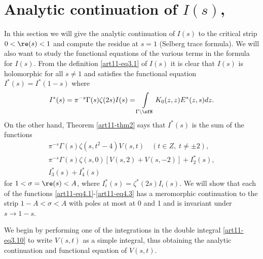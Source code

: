 \section{Analytic continuation of $I(s)$,}\label{art11-sec4}
In this section we will give the analytic continuation of $I(s)$ to the critical strip $0< \re (s) <1$ and compute the residue at $s=1$ (Selberg trace formula). We will also want to study the functional equations of the various terms in the formula for $I(s)$. From the definition \eqref{art11-eq3.1} of $I(s)$ it is clear that $I(s)$ is holomorphic for all $s \neq 1$ and satisfies the functional equation $I^\ast (s) = I^\ast (1-s)$ where
$$
I^\ast (s) = \pi^{-s} \Gamma (s) \zeta (2s) I (s) =\int\limits_{\Gamma \backslash \sfH} K_0 (z, z) E^\ast (z,s) dz.
$$
On the other hand, Theorem \ref{art11-thm2} says that $I^\ast (s)$ is the sum of the functions 
\begin{gather*}
\pi^{-s} \Gamma(s) \zeta (s, t^2 - 4) V (s,t ) \quad (t \in Z , \; t \neq \pm 2) , \tag{4.1}\label{art11-eq4.1}\\
\pi^{-s} \Gamma (s) \zeta (s, 0) [V(s,2) + V(s,-2)] + I^\ast_2 (s), \tag{4.2} \label{art11-eq4.2}\\
I^\ast_3(s) + I^\ast_4 (s ) \tag{4.3}\label{art11-eq4.3}
\end{gather*}\pageoriginale 
for $1 < \sigma = \re (s) < A$, where $I^{\ast}_i(s)  =\zeta^\ast (2s) I_i(s)$. We will show that each of the functions \eqref{art11-eq4.1}-\eqref{art11-eq4.3} has a meromorphic continuation to the strip $1 - A <\sigma < A$ with poles at most at 0 and 1 and is invariant under $s \to 1 -s$. 

We begin by performing one of the integrations in the double integral \eqref{art11-eq3.10} to write $V(s,t)$ as a simple integral, thus obtaining the analytic continuation and functional equation of $V(s,t)$.

